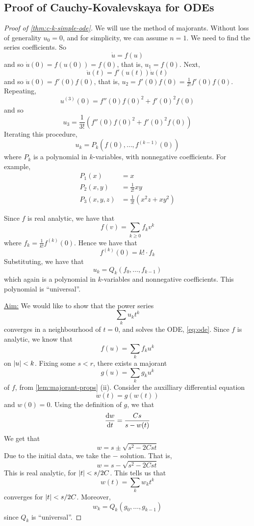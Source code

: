\documentclass{article}
\begin{document}
\lec

\subsection{Proof of Cauchy-Kovalevskaya for ODEs}

\begin{proof}
    [Proof of \cref{thm:c-k-simple-ode}] We will use the method of majorants. Without loss of generality \(u_0 = 0\), and for simplicity, we can assume \(n = 1\). We need to find the series coefficients. So
    \[\dot u = f(u)\]
    and so \(\dot u(0) = f(u(0)) = f(0)\), that is, \(u_1 = f(0)\). Next,
    \[\ddot u(t) = f'(u(t))\dot u(t)\]
    and so \(\ddot u(0) = f'(0)f(0)\), that is, \(u_2 = f'(0)f(0) = \frac{1}{2!}f'(0)f(0)\). Repeating,
    \[u^{(3)}(0) = f''(0)f(0)^2 + f'(0)^2 f(0)\]
    and so
    \[u_3 = \frac{1}{3!}(f''(0)f(0)^2 + f'(0)^2 f(0))\]
    Iterating this procedure,
    \[u_k = P_k\left(f(0), \dots, f^{(k-1)}(0)\right)\]
    where \(P_k\) is a polynomial in \(k\)-variables, with nonnegative coefficients. For example,
    \begin{align*}
        P_1(x) &= x \\
        P_2(x,y) &= \frac{1}{2!}xy \\
        P_3(x,y,z) &= \frac{1}{3!}(x^2z + xy^2)
    \end{align*} 

    Since \(f\) is real analytic, we have that
    \[f(v) = \sum_{k \ge 0} f_k v^k\]
    where \(f_k = \frac{1}{k!}f^{(k)}(0)\). Hence we have that
    \[f^{(k)}(0) = k!\cdot f_k\]
    Substituting, we have that
    \[u_k = Q_k(f_0, \dots, f_{k-1})\]
    which again is a polynomial in \(k\)-variables and nonnegative coefficients. This polynomial is ``universal''.

    \underline{Aim:} We would like to show that the power series
    \[\sum_k u_k t^k\]
    converges in a neighbourhood of \(t = 0\), and solves the ODE, \cref{eq:ode}. Since \(f\) is analytic, we know that
    \[f(u) = \sum_k f_k u^k\]
    on \(\abs{u} < k\). Fixing some \(s < r\), there exists a majorant
    \[g(u) = \sum_k g_k u^k\]
    of \(f\), from \cref{lem:majorant-props} (ii). Consider the auxilliary differential equation
    \[\dot w(t) = g(w(t))\]
    and \(w(0) = 0\). Using the definition of \(g\), we that
    \[\dv{w}{t} = \frac{Cs}{s - w(t)}\]
    We get that
    \[w = s\pm\sqrt{s^2 - 2Cst}\]
    Due to the initial data, we take the \(-\) solution. That is,
    \[w = s - \sqrt{s^2 - 2Cst}\]
    This is real analytic, for \(\abs{t} < s/2C\). This tells us that
    \[w(t)  = \sum_k w_kt^k\]
    converges for \(\abs{t} < s/2C\). Moreover,
    \[w_k = Q_k(g_0, \dots, g_{k-1})\]
    since \(Q_k\) is ``universal''.


\end{proof}
\end{document}

